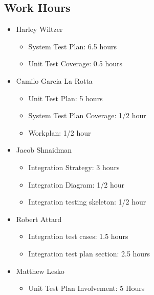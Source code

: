 \documentclass[12pt]{article}
\begin{document}
 \subsection{Work Hours}
%
 \begin{itemize}
     \item Harley Wiltzer
 		\begin{itemize}
 			\item System Test Plan: 6.5 hours
			\item Unit Test Coverage: 0.5 hours
 		\end{itemize}
     \item Camilo Garcia La Rotta
 		\begin{itemize}
 			\item Unit Test Plan: 5 hours
 			\item System Test Plan Coverage: 1/2 hour
 			\item Workplan: 1/2 hour
 		\end{itemize}
     \item Jacob Shnaidman
     \begin{itemize}
         \item Integration Strategy: 3 hours
	 \item Integration Diagram: 1/2 hour
	 \item Integration testing skeleton: 1/2 hour
     \end{itemize}
     \item Robert Attard
     \begin{itemize}
     	\item Integration test cases: 1.5 hours
        \item Integration test plan section: 2.5 hours
     \end{itemize}
     \item Matthew Lesko
     \begin{itemize}
     	\item Unit Test Plan Involvement: 5 Hours
     \end{itemize}
 \end{itemize}



\end{document}
